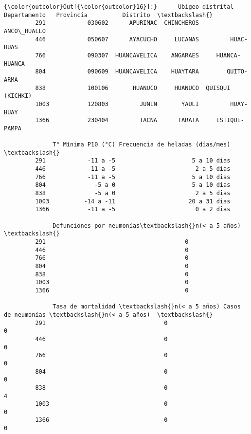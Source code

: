 \documentclass[11pt]{article}
\begin{document}
\begin{Verbatim}[commandchars=\\\{\}]
{\color{outcolor}Out[{\color{outcolor}16}]:}      Ubigeo distrital  Departamento   Provincia          Distrito  \textbackslash{}
         291            030602      APURIMAC  CHINCHEROS       ANCO\_HUALLO   
         446            050607      AYACUCHO     LUCANAS         HUAC-HUAS   
         766            090307  HUANCAVELICA    ANGARAES     HUANCA-HUANCA   
         804            090609  HUANCAVELICA    HUAYTARA        QUITO-ARMA   
         838            100106       HUANUCO     HUANUCO  QUISQUI (KICHKI)   
         1003           120803         JUNIN       YAULI         HUAY-HUAY   
         1366           230404         TACNA      TARATA     ESTIQUE-PAMPA   
         
              T° Mínima P10 (°C) Frecuencia de heladas (días/mes)  \textbackslash{}
         291            -11 a -5                      5 a 10 dias   
         446            -11 a -5                       2 a 5 dias   
         766            -11 a -5                      5 a 10 dias   
         804              -5 a 0                      5 a 10 dias   
         838              -5 a 0                       2 a 5 dias   
         1003          -14 a -11                     20 a 31 dias   
         1366           -11 a -5                       0 a 2 dias   
         
              Defunciones por neumonías\textbackslash{}n(< a 5 años)  \textbackslash{}
         291                                        0   
         446                                        0   
         766                                        0   
         804                                        0   
         838                                        0   
         1003                                       0   
         1366                                       0   
         
              Tasa de mortalidad \textbackslash{}n(< a 5 años) Casos de neumonías \textbackslash{}n(< a 5 años)  \textbackslash{}
         291                                  0                                 0   
         446                                  0                                 0   
         766                                  0                                 0   
         804                                  0                                 0   
         838                                  0                                 4   
         1003                                 0                                 0   
         1366                                 0                                 0   
         

\end{Verbatim}
\end{document}
